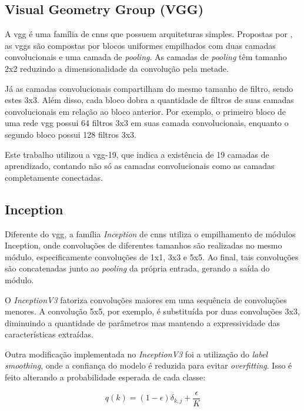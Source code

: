 \subsection{Visual Geometry Group (VGG)}
A \acrshort{vgg} é uma família de \acrshort{cnn}s que possuem arquiteturas simples. 
Propostas por \cite{vgg}, as \acrshort{vgg}s são compostas por blocos uniformes empilhados com duas camadas convolucionais e uma camada de \textit{pooling}. 
As camadas de \textit{pooling} têm tamanho 2x2 reduzindo a dimensionalidade da convolução pela metade. 

Já as camadas convolucionais compartilham do mesmo tamanho de filtro, sendo estes 3x3. Além disso, cada bloco dobra a quantidade de filtros de suas camadas convolucionais em relação ao bloco anterior. Por exemplo, o primeiro bloco de uma rede \acrshort{vgg} possui 64 filtros 3x3 em suas camada convolucionais, enquanto o segundo bloco possui 128 filtros 3x3.

Este trabalho utilizou a \acrshort{vgg}-19, que indica a existência de 19 camadas de aprendizado, contando não só as camadas convolucionais como as camadas completamente conectadas.
\subsection{Inception}

Diferente do \acrshort{vgg}, a família \textit{Inception}\cite{inception} de \acrshort{cnn}s utiliza o empilhamento de módulos Inception, onde convoluções de diferentes tamanhos são realizadas no mesmo módulo, especificamente convoluções de 1x1, 3x3 e 5x5. Ao final, tais convoluções são concatenadas junto ao \textit{pooling} da própria entrada, gerando a saída do módulo. 

O \textit{InceptionV3}\cite{inceptionv3} fatoriza convoluções maiores em uma sequência de convoluções menores. A convolução 5x5, por exemplo, é substituída por duas convoluções 3x3, diminuindo a quantidade de parâmetros mas mantendo a expressividade das características extraídas.

Outra modificação implementada no \textit{InceptionV3} foi a utilização do \textit{label smoothing}, onde a confiança do modelo é reduzida para evitar \textit{overfitting}. Isso é feito alterando a probabilidade esperada de cada classe:

\begin{equation}
    \label{eqn:labelsmoothing}
     q(k) = (1-\epsilon )\delta _{k,j}+\frac{\epsilon }{K}
\end{equation}


